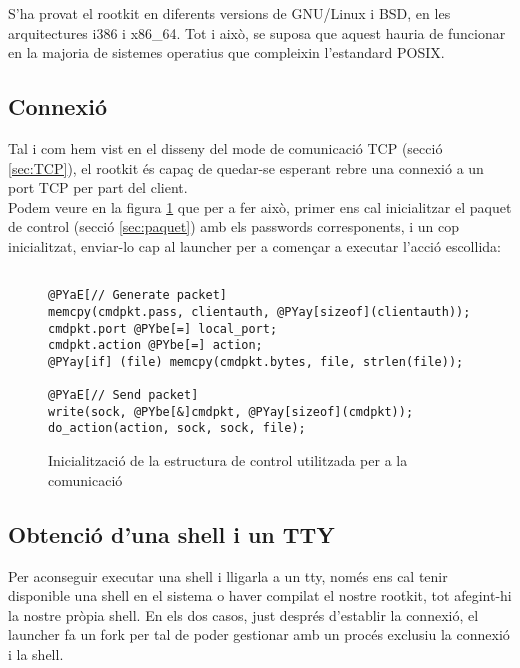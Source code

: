 S'ha provat el rootkit en diferents versions de GNU/Linux i BSD, en les arquitectures i386 i x86\_64. Tot
i això, se suposa que aquest hauria de funcionar en la majoria de sistemes operatius que compleixin 
l'estandard POSIX.


\subsection{Connexió}

Tal i com hem vist en el disseny del mode de comunicació TCP (secció \ref{sec:TCP}), el rootkit és capaç de quedar-se 
esperant rebre una connexió a un port TCP per part del client. \\

Podem veure en la figura \ref{fig:client_tcp_action2} que per a fer això, primer ens cal inicialitzar el paquet de control (secció \ref{sec:paquet}) amb els passwords corresponents, i un cop inicialitzat, enviar-lo cap al launcher per a començar a executar l'acció escollida: 

\begin{figure}[h!]
\begin{Verbatim}[commandchars=@\[\]]

@PYaE[// Generate packet]
memcpy(cmdpkt.pass, clientauth, @PYay[sizeof](clientauth));
cmdpkt.port @PYbe[=] local_port;
cmdpkt.action @PYbe[=] action;
@PYay[if] (file) memcpy(cmdpkt.bytes, file, strlen(file));

@PYaE[// Send packet]
write(sock, @PYbe[&]cmdpkt, @PYay[sizeof](cmdpkt));
do_action(action, sock, sock, file);
\end{Verbatim}
\caption{Inicialització de la estructura de control utilitzada per a la comunicació}
\label{fig:client_tcp_action2}
\end{figure}

\subsection{Obtenció d'una shell i un TTY}

Per aconseguir executar una shell i lligarla a un tty, només ens cal tenir disponible una shell en el sistema o haver compilat el
nostre rootkit, tot afegint-hi la nostre pròpia shell. En els dos casos, just després
d'establir la connexió, el launcher fa un fork per tal de poder gestionar amb un procés exclusiu la connexió i la shell. \\

